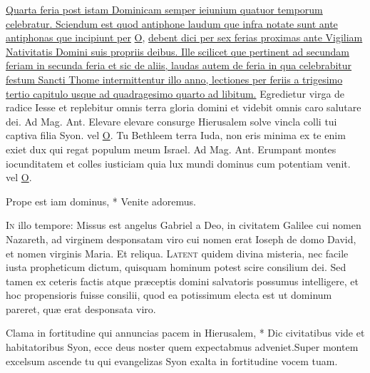\begin{multicols*}{2}
\newline \ul{Quarta feria post istam Dominicam semper ieiunium quatuor temporum celebratur. Sciendum est quod antiphone laudum que infra notate sunt ante antiphonas que incipiunt per} \hyperlink{o-antiphons}{O}, \ul{debent dici per sex ferias proximas ante Vigiliam Nativitatis Domini suis propriis deibus. Ille scilicet que pertinent ad secundam feriam in secunda feria et sic de aliis, laudas autem de feria in qua celebrabitur festum Sancti Thome intermittentur illo anno, lectiones per feriis a trigesimo tertio capitulo usque ad quadragesimo quarto ad libitum.}
 Egredietur virga de radice Iesse et replebitur omnis terra gloria domini et videbit omnis caro salutare dei. {\color{Red} Ad Mag. Ant. } Elevare elevare consurge Hierusalem solve vincla colli tui captiva filia Syon. {\color{Red} vel} \hyperlink{o-antiphons}{O}.
 Tu Bethleem terra Iuda, non eris minima ex te enim exiet dux qui regat populum meum Israel. {\color{Red} Ad Mag. Ant.} Erumpant montes iocunditatem et colles iusticiam quia lux mundi dominus cum potentiam venit. {\color{Red} vel} \hyperlink{o-antiphons}{O}.
\begin{invitatory}
{Prope est iam dominus, * Venite adoremus.}
\end{invitatory}
\lettrine[lines=2]{\zallmancaps \color{Blue} I}{n} illo tempore: Missus est angelus Gabriel a Deo, in civitatem Galilee cui nomen Nazareth, ad virginem desponsatam viro cui nomen erat Ioseph de domo David, et nomen virginis Maria. Et reliqua.
\lettrine[lines=2]{\zallmancaps \color{Red} L}{atent} quidem divina misteria, nec facile iusta propheticum dictum, quisquam hominum potest scire consilium dei. Sed tamen ex ceteris factis atque præceptis domini salvatoris possumus intelligere, et hoc propensioris fuisse consilii, quod ea potissimum electa est ut dominum pareret, quæ erat desponsata viro.
\begin{responsory}
{Clama in fortitudine qui annuncias pacem in Hierusalem, * Dic civitatibus vide et habitatoribus Syon, ecce deus noster quem expectabmus adveniet.}{Super montem excelsum ascende tu qui evangelizas Syon exalta in fortitudine vocem tuam.}

\end{responsory}
\end{multicols*}

